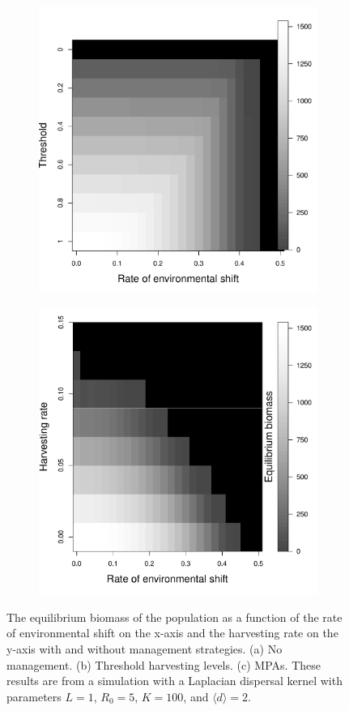 \documentclass[12pt,english]{article}
\begin{document}
\begin{figure}[htbp]
\begin{subfigure}{.33\textwidth}
\includegraphics[width=\textwidth]{plots/eqbiomass_thresh.pdf}
\end{subfigure}
\begin{subfigure}{.33\textwidth}
\subcaption{}
\includegraphics[width=\textwidth]{plots/eqbiomass_mpa.pdf}
\end{subfigure}
\caption{
The equilibrium biomass of the population as a function of the rate of environmental shift on the x-axis and the harvesting rate on the y-axis with and without management strategies.  (a) No management.  (b) Threshold harvesting levels.  (c) MPAs.  These results are from a simulation with a Laplacian dispersal kernel with parameters $L=1$, $R_0=5$, $K=100$, and $\langle d \rangle =2$.
}
\label{management}
\end{figure}
\end{document}
